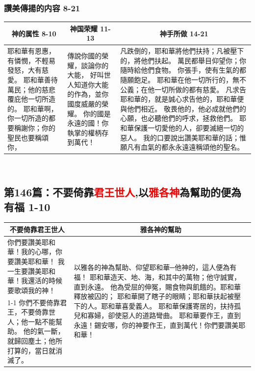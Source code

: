 \subsubsection{讚美傳揚的内容 8-21}
\begin{table}[H]
\centering
\begin{tabular}{p{3.5cm}|p{3.2500cm}|p{10cm}}\hline\hline
\multicolumn{1}{c|}{神的属性 8-10}&\multicolumn{1}{c|}{神国荣耀 11-13}&\multicolumn{1}{c}{神手所做 14-21}\\\hline
耶和華有恩惠，有憐憫，不輕易發怒，大有慈愛。
耶和華善待萬民；他的慈悲覆庇他一切所造的。
耶和華啊，你一切所造的都要稱謝你；你的聖民也要稱頌你，
&傳說你國的榮耀，談論你的大能，
好叫世人知道你大能的作為，並你國度威嚴的榮耀。
你的國是永遠的國！你執掌的權柄存到萬代！
&凡跌倒的，耶和華將他們扶持；凡被壓下的，將他們扶起。
萬民都舉目仰望你；你隨時給他們食物。
你張手，使有生氣的都隨願飽足。
耶和華在他一切所行的，無不公義；在他一切所做的都有慈愛。
凡求告耶和華的，就是誠心求告他的，耶和華便與他們相近。
敬畏他的，他必成就他們的心願，也必聽他們的呼求，拯救他們。
耶和華保護一切愛他的人，卻要滅絕一切的惡人。
我的口要說出讚美耶和華的話；惟願凡有血氣的都永永遠遠稱頌他的聖名。\\\hline
\end{tabular}
\end{table} 


\subsection{第146篇：不要倚靠\textcolor{red}{君王世人},以\textcolor{red}{雅各神}為幫助的便為有福  1-10}
\begin{table}[H]
\centering
\begin{tabular}{p{}|p{10cm}}\hline\hline
\multicolumn{1}{c|}{不要倚靠君王世人}&\multicolumn{1}{c}{雅各神的幫助}\\\hline
你們要讚美耶和華！我的心哪，你要讚美耶和華！
我一生要讚美耶和華！我還活的時候要歌頌我的神！
&\multirow{2}{10.2cm}{以雅各的神為幫助、仰望耶和華─他神的，這人便為有福！
耶和華造天、地、海，和其中的萬物；他守誠實，直到永遠。
他為受屈的伸冤，賜食物與飢餓的。耶和華釋放被囚的；
耶和華開了瞎子的眼睛；耶和華扶起被壓下的人。耶和華喜愛義人。
耶和華保護寄居的，扶持孤兒和寡婦，卻使惡人的道路彎曲。
耶和華要作王，直到永遠！錫安哪，你的神要作王，直到萬代！你們要讚美耶和華！}\\\cline{1-1}
你們不要倚靠君王，不要倚靠世人；他一點不能幫助。
他的氣一斷，就歸回塵土；他所打算的，當日就消滅了。&\\\hline
\end{tabular}
\end{table} 


